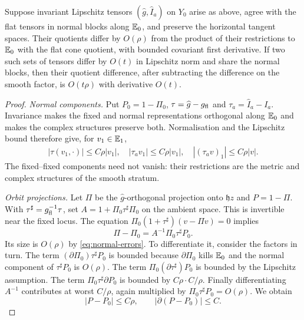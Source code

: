 \begin{lemma}\label{lem:quotient-estimate}
Suppose invariant Lipschitz tensors $(\widehat g,\widehat I_a)$
on $Y_0$ arise as above, agree with the flat tensors in normal
blocks along $\mathbb E_0$, and preserve the horizontal tangent spaces.
Their quotients differ by $O(\rho)$ from the product of their
restrictions to $\mathbb E_0$ with the flat cone quotient, with bounded
covariant first derivative. If two such sets of tensors differ
by $O(t)$ in Lipschitz norm and share the normal blocks, then their
quotient difference, after subtracting the difference on the
smooth factor, is $O(t\rho)$ with derivative $O(t)$.
\end{lemma}
\begin{proof}
\emph{Normal components.}
Put $P_0=1-\Pi_0$, $\tau=\widehat g-g_{\mathrm{fl}}$ and
$\tau_a=\widehat I_a-I_a$. Invariance makes the fixed and
normal representations orthogonal along $\mathbb E_0$ and makes the
complex structures preserve both. Normalisation and the Lipschitz
bound therefore give, for $v_1\in\mathbb E_1$,
\begin{equation}\label{eq:normal-errors}
 \begin{split}
 |\tau(v_1,\cdot)|\le C\rho|v_1|,\quad
 |\tau_av_1|\le C\rho|v_1|,\quad
 |(\tau_av)_1|\le C\rho|v|.
 \end{split}
\end{equation}
The fixed--fixed components need not vanish: their restrictions
are the metric and complex structures of the smooth stratum.

\emph{Orbit projections.}
Let $\Pi$ be the $\widehat g$-orthogonal projection onto
$\mathfrak hz$ and $P=1-\Pi$. With
$\tau^\sharp=g_{\mathrm{fl}}^{-1}\tau$, set
$A=1+\Pi_0\tau^\sharp\Pi_0$ on the ambient space. This
is invertible near the fixed locus. The equation
$\Pi_0(1+\tau^\sharp)(v-\Pi v)=0$ implies
\begin{equation}\label{eq:projection-error}
 \Pi-\Pi_0=
 A^{-1}\Pi_0\tau^\sharp P_0.
\end{equation}
Its size is $O(\rho)$ by \eqref{eq:normal-errors}. To
differentiate it, consider the factors in turn. The term
$(\partial\Pi_0)\tau^\sharp P_0$ is bounded because
$\partial\Pi_0$ kills $\mathbb E_0$ and the normal component of
$\tau^\sharp P_0$ is $O(\rho)$. The term
$\Pi_0(\partial\tau^\sharp)P_0$ is bounded by the Lipschitz
assumption. The term $\Pi_0\tau^\sharp\partial P_0$ is
bounded by $C\rho\cdot C/\rho$. Finally differentiating
$A^{-1}$ contributes at worst $C/\rho$, again multiplied
by $\Pi_0\tau^\sharp P_0=O(\rho)$. We obtain
\begin{equation}\label{eq:projection-bounds}
 |P-P_0|\le C\rho,\qquad |\partial(P-P_0)|\le C.
\end{equation}


\end{proof}
